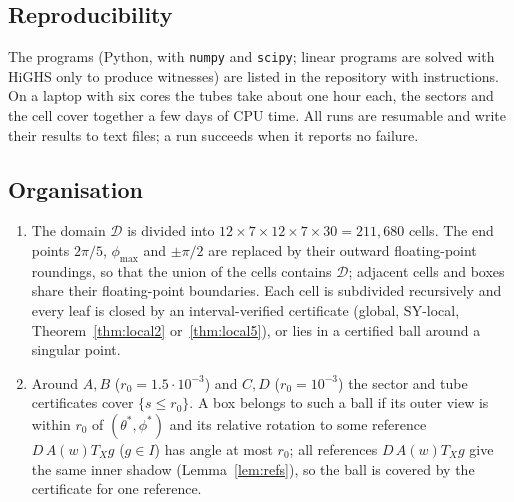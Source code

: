 \documentclass[11pt]{amsart}
\theoremstyle{definition}
\begin{document}
\subsection{Reproducibility}
The programs (Python, with \texttt{numpy} and \texttt{scipy}; linear programs are solved with HiGHS only to produce
witnesses) are listed in the repository with instructions. On a laptop with six cores the tubes take about one hour
each, the sectors and the cell cover together a few days of CPU time. All runs are resumable and write their results
to text files; a run succeeds when it reports no failure.

\subsection{Organisation}
\begin{enumerate}
\item The domain $\mathcal D$ is divided into $12\times7\times12\times7\times30=211{,}680$ cells. The end points $2\pi/5$,
 $\phi_{\max}$ and $\pm\pi/2$ are replaced by their outward floating-point roundings, so that the union of the cells
 contains $\mathcal D$; adjacent cells and boxes share their floating-point boundaries. Each cell is subdivided
 recursively and every leaf is closed by an interval-verified certificate (global, SY-local, Theorem~\ref{thm:local2}
 or~\ref{thm:local5}), or lies in a certified ball around a singular point.
\item Around $A,B$ ($r_0=1.5\cdot10^{-3}$) and $C,D$ ($r_0=10^{-3}$) the sector and tube certificates cover
 $\{s\le r_0\}$. A box belongs to such a ball if its outer view is within $r_0$ of $(\theta^*,\phi^*)$ and its relative
 rotation to some reference $D\,A(w)T_Xg$ ($g\in I$) has angle at most $r_0$; all references $D\,A(w)T_Xg$ give the
 same inner shadow (Lemma~\ref{lem:refs}), so the ball is covered by the certificate for one reference.
\end{enumerate}
\end{document}
